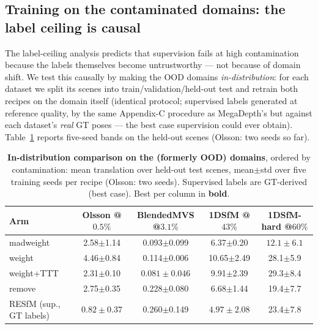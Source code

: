 \documentclass{article}
\newcommand{\mad}{madweight}
\begin{document}
\subsection{Training on the contaminated domains: the label ceiling is causal}\label{sec:indist}
The label-ceiling analysis predicts that supervision fails at high contamination because
the labels themselves become untrustworthy --- not because of domain shift. We test this
causally by making the OOD domains \emph{in-distribution}: for each dataset we split its
scenes into train/validation/held-out test and retrain both recipes on the domain itself
(identical protocol; supervised labels generated at reference quality, by the same
Appendix-C procedure as MegaDepth's but against each dataset's \emph{real} GT poses ---
the best case supervision could ever obtain). Table~\ref{tab:indist} reports five-seed
bands on the held-out scenes (Olsson: two seeds so far).

\begin{table}[t]\centering\footnotesize
\caption{\textbf{In-distribution comparison on the (formerly OOD) domains}, ordered by
contamination: mean translation over held-out test scenes, mean$\pm$std over five
training seeds per recipe (Olsson: two seeds). Supervised labels are GT-derived (best
case). Best per column in \textbf{bold}.}
\label{tab:indist}
\setlength{\tabcolsep}{5pt}%
\begin{tabular}{lcccc}
\toprule
Arm & Olsson @$0.5\%$ & BlendedMVS @$3.1\%$ & 1DSfM @$43\%$ & 1DSfM-hard @$60\%$\\
\midrule
\mad{}      & 2.58$\pm$1.14 & 0.093$\pm$0.099 & 6.37$\pm$0.20 & $\mathbf{12.1\pm 6.1}$\\
weight      & 4.46$\pm$0.84 & 0.114$\pm$0.006 & 10.65$\pm$2.49 & 28.1$\pm$5.9\\
weight+TTT  & 2.31$\pm$0.10 & $\mathbf{0.081\pm 0.046}$ & 9.91$\pm$2.39 & 29.3$\pm$8.4\\
remove      & 2.75$\pm$0.35 & 0.228$\pm$0.080 & 6.68$\pm$1.44 & 19.4$\pm$7.7\\
RESfM (sup., GT labels) & $\mathbf{0.82\pm 0.37}$ & 0.260$\pm$0.149 & $\mathbf{4.97\pm 2.08}$ & 23.4$\pm$7.8\\
\bottomrule
\end{tabular}
\end{table}
\end{document}
